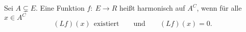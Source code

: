 Sei $A \subsetneq E$. Eine Funktion $f: \: E \to R$ heißt harmonisch auf $A^{C}$, wenn für alle $x \in A^{C}$
\begin{equation*}
(Lf)(x) \: \: \mathrm{existiert} \qquad \mathrm{und} \qquad (Lf)(x) = 0.
\end{equation*}